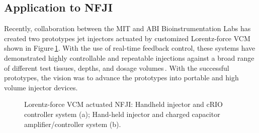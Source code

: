     
    \subsection{Application to \acs{NFJI}}          \label{Chapter:background/voice coil motors for NFJI/application}
    
    
    Recently, collaboration between the \ac{MIT} and \ac{ABI} Bioinstrumentation Labs has created two prototypes jet injectors actuated by customized Lorentz-force \ac{VCM}\,\cite{taberner2006,ruddy2014} shown in Figure\,\ref{fig:chapter/background/vcm injectors}. With the use of real-time feedback control, these systems have demonstrated highly controllable and repeatable injections against a broad range of different test tissues, depths, and dosage volumes\,\cite{taberner2012}. With the successful prototypes, the vision was to advance the prototypes into portable and high volume injector devices.


    \begin{figure}[!ht]
        \centering
        \qquad
        \caption{
            Lorentz-force \acs{VCM} actuated \ac{NFJI}: Handheld injector and cRIO controller system (a); Hand-held injector and charged capacitor amplifier/controller system (b).
        }   \label{fig:chapter/background/vcm injectors}
    \end{figure}
    
